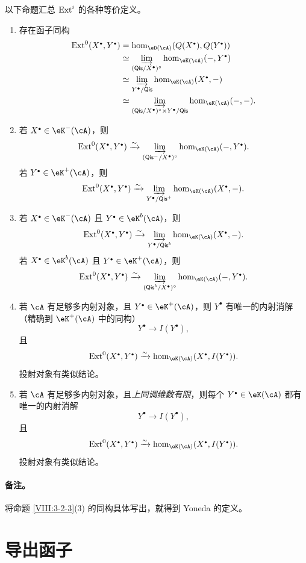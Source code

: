 以下命题汇总 $\operatorname{Ext}^i$ 的各种等价定义。
\begin{proposition}\label{VIII:3-2-3}
\begin{enumerate}
\item 存在函子同构
\begin{align*}
\ext^0(X^\bullet,Y^\bullet)
&=\hom_{\eD(\cA)}(Q(X^\bullet),Q(Y^\bullet))\\
&\simeq\varinjlim_{(\mathsf{Qis}/X^\bullet)^\circ}\hom_{\eK(\cA)}(-,Y^\bullet)\\
&\simeq\varinjlim_{Y^\bullet/\mathsf{Qis}}\hom_{\eK(\cA)}(X^\bullet,-)\\
&\simeq\varinjlim_{(\mathsf{Qis}/X^\bullet)^\circ\times Y^\bullet/\mathsf{Qis}}\hom_{\eK(\cA)}(-,-).
\end{align*}
\item 若 $X^\bullet\in\eK^-(\cA)$，则
\[\ext^0(X^\bullet,Y^\bullet)\iso\varinjlim_{(\mathsf{Qis}^-/X^\bullet)^\circ}\hom_{\eK(\cA)}(-,Y^\bullet).\]
若 $Y^\bullet\in\eK^+(\cA)$，则
\[\ext^0(X^\bullet,Y^\bullet)\iso\varinjlim_{Y^\bullet/\mathsf{Qis}^+}\hom_{\eK(\cA)}(X^\bullet,-).\]
\item 若 $X^\bullet\in\eK^-(\cA)$ 且 $Y^\bullet\in\eK^b(\cA)$，则
\[\ext^0(X^\bullet,Y^\bullet)\iso\varinjlim_{Y^\bullet/\mathsf{Qis}^b}\hom_{\eK(\cA)}(X^\bullet,-).\]
若 $X^\bullet\in\eK^b(\cA)$ 且 $Y^\bullet\in\eK^+(\cA)$，则
\[\ext^0(X^\bullet,Y^\bullet)\iso\varinjlim_{(\mathsf{Qis}^b/X^\bullet)^\circ}\hom_{\eK(\cA)}(-,Y^\bullet).\]
\item 若 $\cA$ 有足够多内射对象，且 $Y^\bullet\in\eK^+(\cA)$，则 $Y^\bullet$ 有唯一的内射消解（精确到 $\eK^+(\cA)$ 中的同构）
\[Y^\bullet\longrightarrow I(Y^\bullet),\]
且
\[\ext^0(X^\bullet,Y^\bullet)\iso\hom_{\eK(\cA)}(X^\bullet,I(Y^\bullet)).\]
投射对象有类似结论。
\item 若 $\cA$ 有足够多内射对象，且\emph{上同调维数有限}，则每个 $Y^\bullet\in\eK(\cA)$ 都有唯一的内射消解
\[Y^\bullet\longrightarrow I(Y^\bullet),\]
且
\[\ext^0(X^\bullet,Y^\bullet)\iso\hom_{\eK(\cA)}(X^\bullet,I(Y^\bullet)).\]
投射对象有类似结论。
\end{enumerate}
\end{proposition}
\paragraph{备注。}将命题 \ref{VIII:3-2-3}(3) 的同构具体写出，就得到 Yoneda 的定义。
\section{导出函子}\label{VIII:4}
